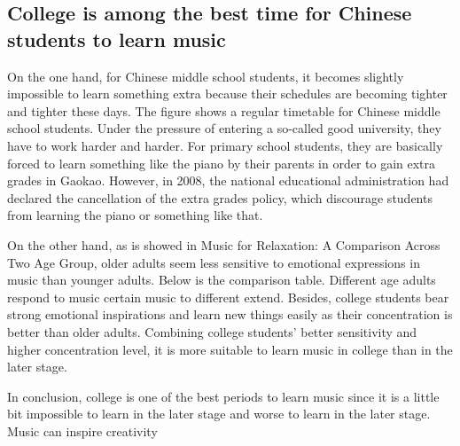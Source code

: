 
\subsection{College is among the best time for Chinese students to learn music}
On the one hand, for Chinese middle school students, it becomes slightly impossible to learn something extra because their schedules are becoming tighter and tighter these days. The figure shows a regular timetable for Chinese middle school students. Under the pressure of entering a so-called good university, they have to work harder and harder. For primary school students, they are basically forced to learn something like the piano by their parents in order to gain extra grades in Gaokao. However, in 2008, the national educational administration had declared the cancellation of the extra grades policy, which discourage students from learning the piano or something like that. \par
On the other hand, as is showed in Music for Relaxation: A Comparison Across Two Age Group, older adults seem less sensitive to emotional expressions in music than younger adults. Below is the comparison table. Different age adults respond to music certain music to different extend. Besides, college students bear strong emotional inspirations and learn new things easily as their concentration is better than older adults. Combining college students’ better sensitivity and higher concentration level, it is more suitable to learn music in college than in the later stage.\par
In conclusion, college is one of the best periods to learn music since it is a little bit impossible to learn in the later stage and worse to learn in the later stage.
Music can inspire creativity

